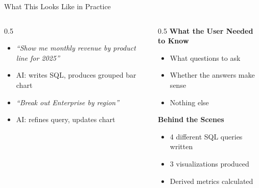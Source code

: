 \documentclass[aspectratio=169]{beamer}
\begin{document}
\begin{frame}{What This Looks Like in Practice}
\begin{columns}[T]
\begin{column}{0.5\textwidth}
\begin{shadedbox}[title=\textbf{The Conversation}]
\begin{itemize}\small
  \item \textit{``Show me monthly revenue by product line for 2025''}
  \item AI: writes SQL, produces grouped bar chart
  \item \textit{``Break out Enterprise by region''}
  \item AI: refines query, updates chart
\end{itemize}
\end{shadedbox}
\end{column}
\begin{column}{0.5\textwidth}
\textbf{What the User Needed to Know}
\begin{itemize}\small
  \item What questions to ask
  \item Whether the answers make sense
  \item \alert{Nothing else}
\end{itemize}
\vspace{0.1cm}
\textbf{Behind the Scenes}
\begin{itemize}\small
  \item 4 different SQL queries written
  \item 3 visualizations produced
  \item Derived metrics calculated
\end{itemize}
\end{column}
\end{columns}
\end{frame}
\end{document}
